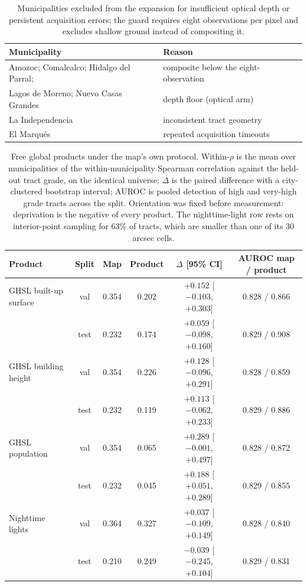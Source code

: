 \documentclass[11pt]{article}
\begin{document}
\begin{table}[h]
\centering
\caption{Municipalities excluded from the expansion for insufficient optical depth or
persistent acquisition errors; the guard requires eight observations per pixel and
excludes shallow ground instead of compositing it.}
\begin{tabular}{ll}
\toprule
Municipality & Reason\\
\midrule
Amozoc; Comalcalco; Hidalgo del Parral; & composite below the eight-observation\\
Lagos de Moreno; Nuevo Casas Grandes & depth floor (optical arm)\\
La Independencia & inconsistent tract geometry\\
El Marqu\'es & repeated acquisition timeouts\\
\bottomrule
\end{tabular}
\end{table}

\begin{table}[h]
\centering
\caption{Free global products under the map's own protocol. Within-$\rho$ is the mean
over municipalities of the within-municipality Spearman correlation against the held-out
tract grade, on the identical universe; $\Delta$ is the paired difference with a
city-clustered bootstrap interval; AUROC is pooled detection of high and very-high grade
tracts across the split. Orientation was fixed before measurement: deprivation is the
negative of every product. The nighttime-light row rests on interior-point sampling for 63\%
of tracts, which are smaller than one of its 30 arcsec cells.}
\begin{tabular}{lccccc}
\toprule
Product & Split & Map & Product & $\Delta$ [95\% CI] & AUROC map / product\\
\midrule
GHSL built-up surface & val & 0.354 & 0.202 & $+0.152$ [$-0.103$, $+0.303$] & 0.828 / 0.866\\
 & test & 0.232 & 0.174 & $+0.059$ [$-0.098$, $+0.160$] & 0.829 / 0.908\\
GHSL building height & val & 0.354 & 0.226 & $+0.128$ [$-0.096$, $+0.291$] & 0.828 / 0.859\\
 & test & 0.232 & 0.119 & $+0.113$ [$-0.062$, $+0.233$] & 0.829 / 0.886\\
GHSL population & val & 0.354 & 0.065 & $+0.289$ [$-0.001$, $+0.497$] & 0.828 / 0.872\\
 & test & 0.232 & 0.045 & $+0.188$ [$+0.051$, $+0.289$] & 0.829 / 0.855\\
Nighttime lights & val & 0.364 & 0.327 & $+0.037$ [$-0.109$, $+0.149$] & 0.828 / 0.840\\
 & test & 0.210 & 0.249 & $-0.039$ [$-0.245$, $+0.104$] & 0.829 / 0.831\\
\bottomrule
\end{tabular}
\end{table}
\end{document}
